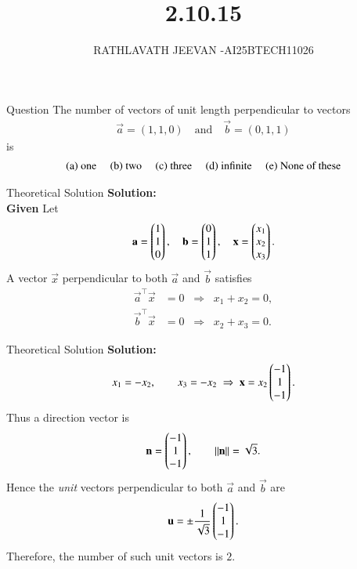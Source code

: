 \documentclass{beamer}
\title %
{2.10.15}
\author %
{RATHLAVATH JEEVAN -AI25BTECH11026}
\begin{document}
\frame{\titlepage}
\begin{frame}{Question}
The number of vectors of unit length perpendicular to vectors 
\begin{align}
\vec{a} = (1,1,0) \quad \text{and} \quad \vec{b} = (0,1,1)
\end{align}
is
\begin{align}
\text{(a) one \quad (b) two \quad (c) three \quad (d) infinite \quad (e) None of these}
\end{align}
\end{frame}
\begin{frame}{Theoretical Solution} 
\textbf{Solution:}\\
 \textbf{Given}  
Let
\begin{align}
\mathbf{a}=\begin{pmatrix}1\\1\\0\end{pmatrix},\quad 
\mathbf{b}=\begin{pmatrix}0\\1\\1\end{pmatrix}, \quad
\mathbf{x}=\begin{pmatrix}x_1\\x_2\\x_3\end{pmatrix}.
\end{align}
A vector $\vec{x}$ perpendicular to both $\vec{a}$ and $\vec{b}$ satisfies
\begin{align}
\vec{a}^\top\vec{x} &= 0 \;\;\Rightarrow\;\; x_1+x_2=0,
\label{eq:q1-ax0}\\
\vec{b}^\top\vec{x} &= 0 \;\;\Rightarrow\;\; x_2+x_3=0.
\label{eq:q1-bx0}
\end{align}
\end{frame}
\begin{frame}{Theoretical Solution} 
\textbf{Solution:}\\
\begin{align}
x_1=-x_2,\qquad x_3=-x_2
\;\Rightarrow\;
\mathbf{x}=x_2\begin{pmatrix}-1\\1\\-1\end{pmatrix}.
\label{eq:q1-dir}
\end{align}
Thus a direction vector is
\begin{align}
\mathbf{n}=\begin{pmatrix}-1\\1\\-1\end{pmatrix},\qquad 
\|\mathbf{n}\|=\sqrt{3}.
\label{eq:q1-norm}
\end{align}
Hence the \emph{unit} vectors perpendicular to both $\vec{a}$ and $\vec{b}$ are
\begin{align}
\mathbf{u}=\pm\frac{1}{\sqrt{3}}\begin{pmatrix}-1\\1\\-1\end{pmatrix}.
\label{eq:q1-unit}
\end{align}
Therefore, the number of such unit vectors is $\boxed{2}$.
\end{frame}
\end{document}
